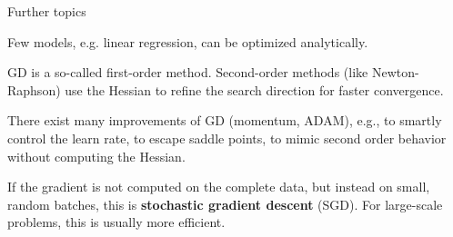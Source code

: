 \documentclass[11pt,compress,t,notes=noshow, xcolor=table]{beamer}
\begin{document}
\begin{vbframe}{Further topics}
  \begin{itemizefill}
    
    \item Few models, e.g. linear regression, can be optimized analytically. 
    
    \item GD is a so-called first-order method. Second-order methods (like Newton-Raphson) use the Hessian to refine the search direction for faster convergence.
    \item There exist many improvements of GD (momentum, ADAM), e.g., to smartly control the learn rate, to escape saddle points, to mimic second order behavior without computing the Hessian.
    \item If the gradient is not computed on the complete data, but instead on small, random batches, this is \textbf{stochastic gradient descent} (SGD). For large-scale problems, this is usually more efficient.
  \end{itemizefill}
\end{vbframe}




\endlecture
\end{document}
